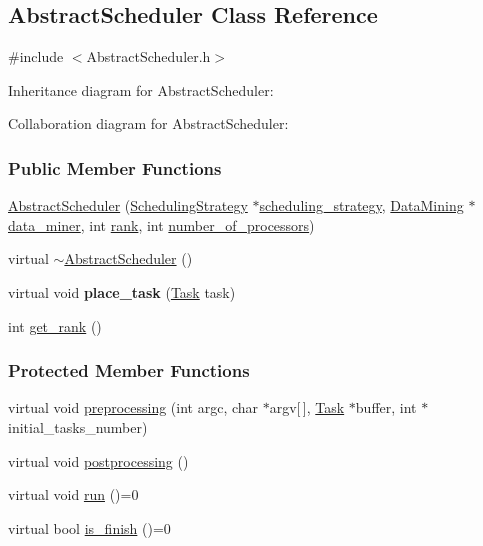 \hypertarget{a00004}{}\subsection{Abstract\+Scheduler Class Reference}
\label{a00004}


{\ttfamily \#include $<$Abstract\+Scheduler.\+h$>$}



Inheritance diagram for Abstract\+Scheduler\+:


Collaboration diagram for Abstract\+Scheduler\+:
\subsubsection*{Public Member Functions}
\begin{DoxyCompactItemize}
\item 
\hyperlink{a00004_addaf6f185aefd7304df9a3cc4e020b00}{Abstract\+Scheduler} (\hyperlink{a00033}{Scheduling\+Strategy} $\ast$\hyperlink{a00004_a7dd11eee79bfb44c820d6c28480fd0c7}{scheduling\+\_\+strategy}, \hyperlink{a00013}{Data\+Mining} $\ast$\hyperlink{a00004_a6e281d90fa4b965779cd13eabf7d0249}{data\+\_\+miner}, int \hyperlink{a00015_a33c24e2887b4d9c4ef7f3566d3bc803e}{rank}, int \hyperlink{a00015_a4e798bde66d26fe200de7e8d2b54e915}{number\+\_\+of\+\_\+processors})
\item 
virtual \hyperlink{a00004_a1f8fb108f61bf092407c6fba1afb8578}{$\sim$\+Abstract\+Scheduler} ()
\item 
\hypertarget{a00004_a5171d8f76ad183ea1d0f6bb393293be8}{}virtual void {\bfseries place\+\_\+task} (\hyperlink{a00002}{Task} task)\label{a00004_a5171d8f76ad183ea1d0f6bb393293be8}

\item 
int \hyperlink{a00004_a205d6e6fd08ffbc000a79944f9f59853}{get\+\_\+rank} ()
\end{DoxyCompactItemize}
\subsubsection*{Protected Member Functions}
\begin{DoxyCompactItemize}
\item 
virtual void \hyperlink{a00004_a284ad11479af671abf7130abb5f69992}{preprocessing} (int argc, char $\ast$argv\mbox{[}$\,$\mbox{]}, \hyperlink{a00002}{Task} $\ast$buffer, int $\ast$initial\+\_\+tasks\+\_\+number)
\item 
virtual void \hyperlink{a00004_a3c2b64a8a6de2687258dea9d58769792}{postprocessing} ()
\item 
virtual void \hyperlink{a00004_ab5f9142ccfc130e91fa6d92c7d3d7469}{run} ()=0
\item 
virtual bool \hyperlink{a00004_acc7d6dc38aa80ca77ac892c74b915432}{is\+\_\+finish} ()=0
\end{DoxyCompactItemize}
